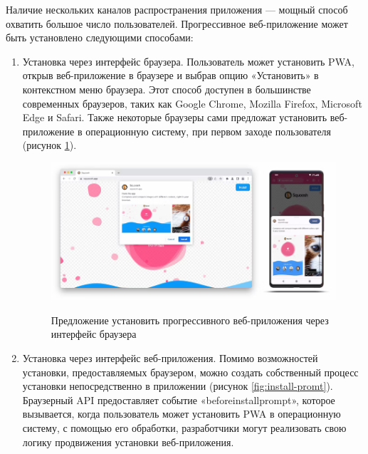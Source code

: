 Наличие нескольких каналов распространения приложения — мощный способ охватить большое число пользователей. Прогрессивное веб-приложение может быть установлено следующими способами:

\begin{enumerate} 
  \item Установка через интерфейс браузера. Пользователь может установить PWA, открыв веб-приложение в браузере и выбрав опцию «Установить» в контекстном меню браузера. Этот способ доступен в большинстве современных браузеров, таких как Google Chrome, Mozilla Firefox, Microsoft Edge и Safari. Также некоторые браузеры сами предложат установить веб-приложение в операционную систему, при первом заходе пользователя (рисунок \ref{fig:install-browser}).

\begin{figure}[H]
\begin{center}
\includegraphics[width=1.0\hsize]{fig/install-browser.png}\\[2mm]
\caption{Предложение установить прогрессивного веб-приложения через интерфейс браузера}\label{fig:install-browser}
\end{center}
\end{figure}
  
  \item Установка через интерфейс веб-приложения. Помимо возможностей установки, предоставляемых браузером, можно создать собственный процесс установки непосредственно в приложении (рисунок \ref{fig:install-promt}). Браузерный API предоставляет событие «beforeinstallprompt», которое вызывается, когда пользователь может установить PWA в операционную систему, с помощью его обработки, разработчики могут реализовать свою логику продвижения установки веб-приложения.


\end{enumerate}
